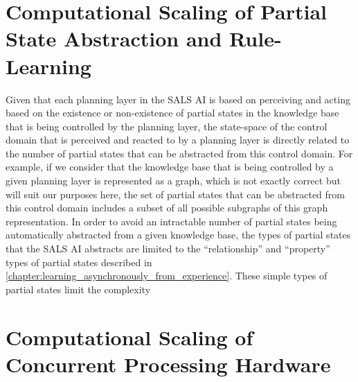 \section{Computational Scaling of Partial State Abstraction and Rule-Learning}

Given that each planning layer in the SALS AI is based on perceiving
and acting based on the existence or non-existence of partial states
in the knowledge base that is being controlled by the planning layer,
the state-space of the control domain that is perceived and reacted to
by a planning layer is directly related to the number of partial
states that can be abstracted from this control domain.  For example,
if we consider that the knowledge base that is being controlled by a
given planning layer is represented as a graph, which is not exactly
correct but will suit our purposes here, the set of partial states
that can be abstracted from this control domain includes a subset of
all possible subgraphs of this graph representation.  In order to
avoid an intractable number of partial states being automatically
abstracted from a given knowledge base, the types of partial states
that the SALS AI abstracts are limited to the ``relationship'' and
``property'' types of partial states described in
{\mbox{\autoref{chapter:learning_asynchronously_from_experience}}}.
These simple types of partial states limit the complexity





\section{Computational Scaling of Concurrent Processing Hardware}




